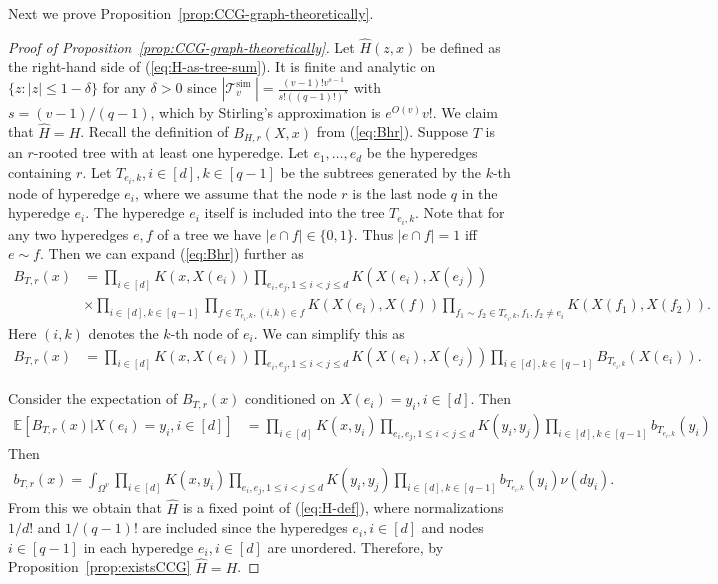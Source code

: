\documentclass[12pt]{article}
\newcommand{\E}{\mathbb{E}}
\begin{document}
Next we prove Proposition~\ref{prop:CCG-graph-theoretically}.
\begin{proof}[Proof of Proposition~\ref{prop:CCG-graph-theoretically}]
Let $\hat H(z,x)$ be defined as the right-hand side of (\ref{eq:H-as-tree-sum}). It is finite and analytic on $\{z:|z|\le 1-\delta\}$ for any $\delta>0$
since $\left|\mathcal{T}_v^{\text {sim }}\right|=\frac{(v-1)!v^{s-1}}{s!((q-1)!)^s}$ with $s=(v-1)/(q-1)$, which by Stirling's approximation is  
$e^{O(v)}v!$. We claim that $\hat H=H$. 
Recall the definition of $B_{H,r}(X,x)$ from (\ref{eq:Bhr}). Suppose $T$ is an $r$-rooted tree with at least one hyperedge. 
Let $e_1,\ldots,e_d$ be the hyperedges containing $r$.
Let $T_{e_i, k}, i\in [d], k\in [q-1]$ be the subtrees generated by the  $k$-th node of hyperedge $e_i$, where we assume that the node $r$ is the last node $q$
in the hyperedge $e_i$. The hyperedge $e_i$ itself is  included into the tree $T_{e_i,k}$.
Note that for any two hyperedges $e,f$ of a tree we have $|e\cap f|\in \{0,1\}$.
Thus $|e\cap f|=1$ iff $e\sim f$.
Then we can expand (\ref{eq:Bhr}) further as 
\begin{align*}
B_{T,r}(x)&=\prod_{i\in [d]}K(x,X(e_i))\prod_{e_i,e_j, 1\leq i<j\leq d}K(X(e_i),X(e_j)) \\
&\times \prod_{i\in [d], k\in [q-1]}\prod_{f\in T_{e_i,k}, (i,k)\in f} K(X(e_i),X(f))\prod_{f_1\sim f_2\in T_{e_i,k},f_1,f_2\neq e_i}K(X(f_1),X(f_2)).
\end{align*}
Here $(i,k)$ denotes the $k$-th node of $e_i$. We can simplify this as
\begin{align*}
B_{T,r}(x)&=\prod_{i\in [d]}K(x,X(e_i))\prod_{e_i,e_j, 1\leq i<j\leq d}K(X(e_i),X(e_j))\prod_{i\in [d], k\in [q-1]}B_{T_{e_i,k}}(X(e_i)).
\end{align*}



Consider the  expectation of $B_{T,r}(x)$  conditioned on   $X(e_i)=y_i, i\in [d]$. Then 
\begin{align*}
\E[B_{T,r}(x)| X(e_i)=y_i, i\in [d]] &=
\prod_{i\in [d]}K(x,y_i)\prod_{e_i,e_j, 1\leq i<j\leq d}K(y_i,y_j)
\prod_{i\in [d], k\in [q-1]}b_{T_{e_i,k}}(y_i)
\end{align*}
Then
\begin{align*}
b_{T,r}(x) = \int_{\Omega^v}\prod_{i\in [d]}K(x,y_i)\prod_{e_i,e_j, 1\leq i<j\leq d}K(y_i,y_j)
\prod_{i\in [d], k\in [q-1]}b_{T_{e_i,k}}(y_i) \nu(dy_i).
\end{align*}
From this we obtain that $\hat H$ is a fixed point of (\ref{eq:H-def}), 
where normalizations $1/d!$ and $1/(q-1)!$ are included since the hyperedges $e_i, i\in [d]$ and nodes $i\in [q-1]$
in each hyperedge $e_i, i\in [d]$ are unordered. Therefore, by Proposition~\ref{prop:existsCCG} $\hat H=H$. 
\end{proof}
\end{document}
